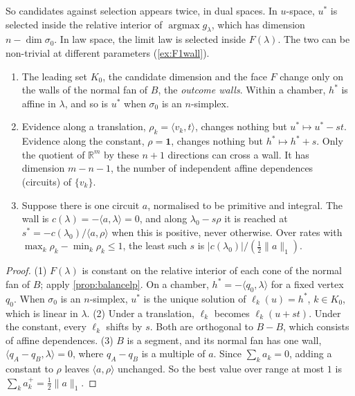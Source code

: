 \documentclass[11pt]{article}
\theoremstyle{definition}\newtheorem{definition}[theorem]{Definition}\newtheorem{remark}[theorem]{Remark}\newtheorem{example}[theorem]{Example}\newtheorem{problem}[theorem]{Open problem}\crefname{problem}{Problem}{Problems}
\newcommand{\R}{\mathbb R}
\begin{document}
So candidates against selection appears twice, in dual spaces. In $u$-space, $u^*$ is selected inside the relative interior of $\operatorname{argmax}g_\lambda$, which has dimension $n-\dim\sigma_0$. In law space, the
limit law is selected inside $F(\lambda)$. The two can be non-trivial at different parameters (\cref{ex:F1wall}).

\begin{corollary}\label{cor:where}
\begin{enumerate}
\item[(1)] The leading set $K_0$, the candidate dimension and the face $F$ change only on the walls of the normal fan of $B$, the \emph{outcome walls}. Within a
  chamber, $h^*$ is affine in $\lambda$, and so is $u^*$ when $\sigma_0$ is an $n$-simplex.
\item[(2)] Evidence along a translation, $\rho_k=\langle v_k,t\rangle$, changes nothing but $u^*\mapsto u^*-st$. Evidence along the constant, $\rho=\mathbf 1$, changes nothing but $h^*\mapsto h^*+s$. Only the quotient of $\R^m$ by these
  $n+1$ directions can cross a wall. It has dimension $m-n-1$, the number of independent affine dependences (circuits) of $\{v_k\}$.
\item[(3)] Suppose there is one circuit $a$, normalised to be primitive and integral. The wall is $c(\lambda)=-\langle a,\lambda\rangle=0$, and along $\lambda_0-s\rho$ it is reached at
  $s^*=-c(\lambda_0)/\langle a,\rho\rangle$ when this is positive, never otherwise. Over rates with $\max_k\rho_k-\min_k\rho_k\le1$, the least such $s$ is $|c(\lambda_0)|/(\tfrac12\|a\|_1)$.
\end{enumerate}
\end{corollary}

\begin{proof}
(1) $F(\lambda)$ is constant on the relative interior of each cone of the normal fan of $B$; apply \cref{prop:balancelp}. On a chamber, $h^*=-\langle q_0,\lambda\rangle$ for a fixed vertex $q_0$. When $\sigma_0$ is an
$n$-simplex, $u^*$ is the unique solution of $\ell_k(u)=h^*$, $k\in K_0$, which is linear in $\lambda$. (2) Under a translation, $\ell_k$ becomes $\ell_k(u+st)$. Under the constant, every $\ell_k$ shifts by $s$.
Both are orthogonal to $B-B$, which consists of affine dependences. (3) $B$ is a segment, and its normal fan has one wall, $\langle q_A-q_B,\lambda\rangle=0$, where $q_A-q_B$ is a multiple of $a$.
Since $\sum_ka_k=0$, adding a constant to $\rho$ leaves $\langle a,\rho\rangle$ unchanged. So the best value over range at most $1$ is $\sum_ka_k^+=\tfrac12\|a\|_1$.
\end{proof}
\end{document}

